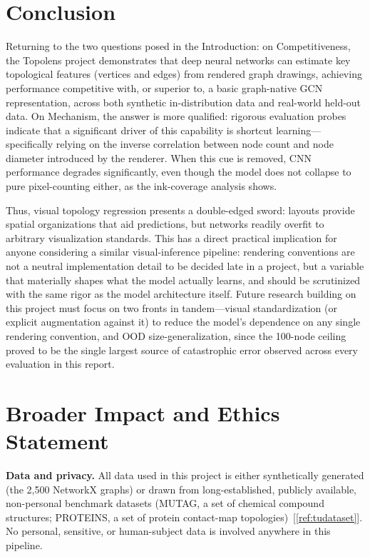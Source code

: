\documentclass[11pt,letterpaper]{article}
\numberwithin{equation}{section}
\numberwithin{figure}{section}
\numberwithin{table}{section}
\begin{document}
\section{Conclusion}
\label{sec:conclusion}
Returning to the two questions posed in the Introduction: on Competitiveness, the Topolens project demonstrates that deep neural networks can estimate key topological features (vertices and edges) from rendered graph drawings, achieving performance competitive with, or superior to, a basic graph-native GCN representation, across both synthetic in-distribution data and real-world held-out data. On Mechanism, the answer is more qualified: rigorous evaluation probes indicate that a significant driver of this capability is shortcut learning---specifically relying on the inverse correlation between node count and node diameter introduced by the renderer. When this cue is removed, CNN performance degrades significantly, even though the model does not collapse to pure pixel-counting either, as the ink-coverage analysis shows.

Thus, visual topology regression presents a double-edged sword: layouts provide spatial organizations that aid predictions, but networks readily overfit to arbitrary visualization standards. This has a direct practical implication for anyone considering a similar visual-inference pipeline: rendering conventions are not a neutral implementation detail to be decided late in a project, but a variable that materially shapes what the model actually learns, and should be scrutinized with the same rigor as the model architecture itself. Future research building on this project must focus on two fronts in tandem---visual standardization (or explicit augmentation against it) to reduce the model's dependence on any single rendering convention, and OOD size-generalization, since the 100-node ceiling proved to be the single largest source of catastrophic error observed across every evaluation in this report.

\section{Broader Impact and Ethics Statement}
\label{sec:broaderimpact}
\textbf{Data and privacy.} All data used in this project is either synthetically generated (the 2,500 NetworkX graphs) or drawn from long-established, publicly available, non-personal benchmark datasets (MUTAG, a set of chemical compound structures; PROTEINS, a set of protein contact-map topologies)~[\ref{ref:tudataset}]. No personal, sensitive, or human-subject data is involved anywhere in this pipeline.
\end{document}
